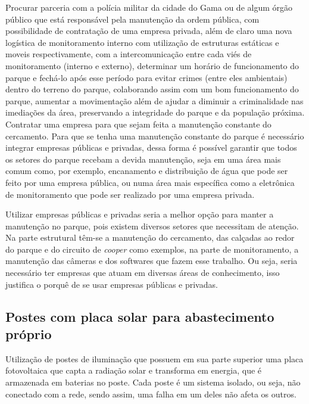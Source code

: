 Procurar parceria com a pol\'icia militar da cidade do Gama ou de algum \'org\~ao p\'ublico que est\'a respons\'avel pela manuten\c{c}\~ao da ordem p\'ublica, com possibilidade de contrata\c{c}\~ao de uma empresa privada, al\'em de claro uma nova log\'istica de monitoramento interno com utiliza\c{c}\~ao de estruturas est\'aticas e moveis respectivamente, com a intercomunica\c{c}\~ao entre cada vi\'es de monitoramento (interno e externo), determinar um hor\'ario de funcionamento do parque e fech\'a-lo ap\'os esse per\'iodo para evitar crimes (entre eles ambientais) dentro do terreno do parque, colaborando assim com um bom funcionamento do parque, aumentar a movimenta\c{c}\~ao al\'em de ajudar a diminuir a criminalidade nas imedia\c{c}\~oes da \'area, preservando a integridade do parque e da popula\c{c}\~ao pr\'oxima. Contratar uma empresa para que sejam feita a manuten\c{c}\~ao constante do cercamento. Para que se tenha uma manuten\c{c}\~ao constante do parque \'e necess\'ario integrar empresas p\'ublicas e privadas, dessa forma \'e poss\'ivel garantir que todos os setores do parque recebam a devida manuten\c{c}\~ao, seja em uma \'area mais comum como, por exemplo, encanamento e distribui\c{c}\~ao de \'agua que pode ser feito por uma empresa p\'ublica, ou numa \'area mais espec\'ifica como a eletr\^onica de monitoramento que pode ser realizado por uma empresa privada.
	
	Utilizar empresas p\'ublicas e privadas seria a melhor op\c{c}\~ao para manter a manuten\c{c}\~ao no parque, pois existem diversos setores que necessitam de aten\c{c}\~ao. Na parte estrutural t\^em-se a manuten\c{c}\~ao do cercamento, das cal\c{c}adas ao redor do parque e do circuito de \textit{cooper} como exemplos, na parte de monitoramento, a manuten\c{c}\~ao das c\^ameras e dos softwares que fazem esse trabalho. Ou seja, seria necess\'ario ter empresas que atuam em diversas \'areas de conhecimento, isso justifica o porqu\^e de se usar empresas p\'ublicas e privadas.

\subsection{Postes com placa solar para abastecimento pr\'oprio}

Utiliza\c{c}\~ao de postes de ilumina\c{c}\~ao que possuem em sua parte superior uma placa fotovoltaica que capta a radia\c{c}\~ao solar e transforma em energia, que \'e armazenada em baterias no poste. Cada poste \'e um sistema isolado, ou seja, n\~ao conectado com a rede, sendo assim, uma falha em um deles n\~ao afeta os outros.

